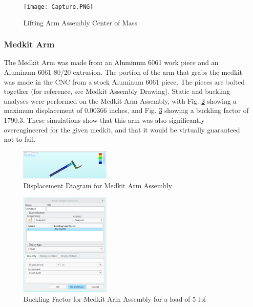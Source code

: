 \begin{figure}[hp]
    \centering
    \texttt{[image: Capture.PNG]}
    \caption{Lifting Arm Assembly Center of Mass}
    \label{fig:FrontFork}
\end{figure}
\newpage

\subsubsection{Medkit Arm}

The Medkit Arm was made from an Aluminum 6061 work piece and an Aluminum 6061 80/20 extrusion. The portion of the arm that grabs the medkit was made in the CNC from a stock Aluminum 6061 piece. The pieces are bolted together (for reference, see Medkit Assembly Drawing). Static and buckling analyses were performed on the Medkit Arm Assembly, with Fig. \ref{fig:disp3} showing a maximum displacement of 0.00366 inches, and Fig. \ref{fig:buck3} showing a buckling factor of 1790.3. These simulations show that this arm was also significantly overengineered for the given medkit, and that it would be virtually guaranteed not to fail.

\begin{figure}[hp]
    \centering
    \includegraphics[width=0.4\textwidth]{Images/medkit_displ.PNG}
    \caption{Displacement Diagram for Medkit Arm Assembly}
    \label{fig:disp3}
\end{figure}
\newpage

\begin{figure}[hp]
    \centering
    \includegraphics[width=0.4\textwidth]{Images/medkit_buckling.PNG}
    \caption{Buckling Factor for Medkit Arm Assembly for a load of 5 lbf}
    \label{fig:buck3}
\end{figure}
\newpage

